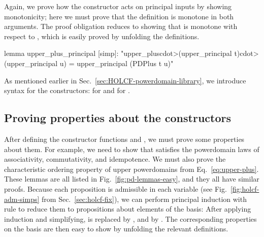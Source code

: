 %
Again, we prove how the constructor acts on principal inputs by showing monotonicity; here we must prove that the definition is monotone in both arguments. The proof obligation reduces to showing that  is monotone with respect to , which is easily proved by unfolding the definitions.
%
\begin{isacode}
lemma upper_plus_principal [simp]:
  "upper_plus\<cdot>(upper_principal t)\<cdot>(upper_principal u) =
    upper_principal (PDPlus t u)"
\end{isacode}
%
As mentioned earlier in Sec.~\ref{sec:HOLCF-powerdomain-library}, we introduce syntax for the constructors:  for  and  for .

\subsection{Proving properties about the constructors}
\label{sec:pd-proofs}

After defining the constructor functions  and , we must prove some properties about them. For example, we need to show that  satisfies the powerdomain laws of associativity, commutativity, and idempotence. We must also prove the characteristic ordering property of upper powerdomains from Eq.~\eqref{eq:upper-plus}. These lemmas are all listed in Fig.~\ref{fig:pd-lemmas-easy}, and they all have similar proofs. Because each proposition is admissible in each variable (see Fig.~\ref{fig:holcf-adm-simps} from Sec.~\ref{sec:holcf-fix}), we can perform principal induction with rule  to reduce them to propositions about elements of the basis: After applying induction and simplifying,  is replaced by , and  by . The corresponding properties on the basis are then easy to show by unfolding the relevant definitions.

